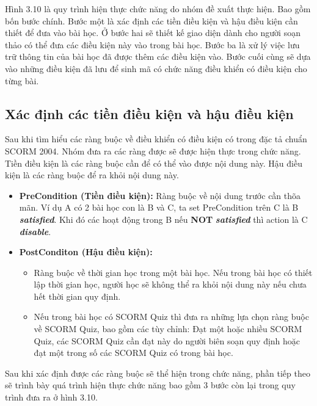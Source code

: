 	Hình 3.10 là quy trình hiện thực chức năng do nhóm đề xuất thực hiện. Bao gồm bốn bước chính. Bước một là xác định các tiền điều kiện và hậu điều kiện cần thiết để đưa vào bài học. Ở bước hai sẽ thiết kế giao diện dành cho người soạn thảo có thể đưa các điều kiện này vào trong bài học. Bước ba là xử lý việc lưu trữ thông tin của bài học đã được thêm các điều kiện vào. Bước cuối cùng sẽ dựa vào những điều kiện đã lưu để sinh mã có chức năng điều khiển có điều kiện cho từng bài.\\
	
	
	
\subsection{Xác định các tiền điều kiện và hậu điều kiện}

	Sau khi tìm hiểu các ràng buộc về điều khiển có điều kiện có trong đặc tả chuẩn SCORM 2004. Nhóm đưa ra các ràng được sẽ được hiện thực trong chức năng. Tiền điều kiện là các ràng buộc cần để có thể vào được nội dung này. Hậu điều kiện là các ràng buộc để ra khỏi nội dung này.


\begin{itemize}
	\item \textbf{PreCondition (Tiền điều kiện):} Ràng buộc về nội dung trước cần thõa mãn. Ví dụ A có 2 bài học con là B và C, ta set PreCondition trên C là B \textbf{\textit{satisfied}}. Khi đó  các hoạt động trong B nếu \textbf{NOT} \textbf{\textit{satisfied}} thì action là C \textbf{\textit{disable}}.
	
	\item \textbf{PostConditon (Hậu điều kiện):}
	\begin{itemize}
		\item Ràng buộc về thời gian học trong một bài học. Nếu trong bài học có thiết lập thời gian học, người học sẽ không thể ra khỏi nội dung này nếu chưa hết thời gian quy định.
		
		\item Nếu trong bài học có SCORM Quiz thì đưa ra những lựa chọn ràng buộc về SCORM Quiz, bao gồm các tùy chỉnh: Đạt một hoặc nhiều SCORM Quiz, các SCORM Quiz cần đạt này do người biên soạn quy định hoặc đạt một trong số các SCORM Quiz có trong bài học.
	\end{itemize}

	
\end{itemize}

	Sau khi xác định được các ràng buộc sẽ thể hiện trong chức năng, phần tiếp theo sẽ trình bày quá trình hiện thực chức năng bao gồm 3 bước còn lại trong quy trình đưa ra ở hình 3.10.



